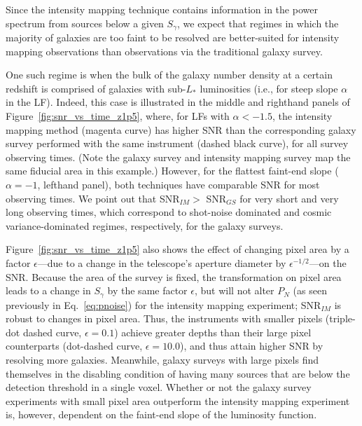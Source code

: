 \documentclass[12pt,preprint]{emulateapj}
\begin{document}
Since the intensity mapping technique contains information in the power spectrum from sources below a given $S_{\gamma}$, we expect that regimes in which the majority of galaxies are too faint to be resolved are better-suited for intensity mapping observations than observations via the traditional galaxy survey. 

One such regime is when the bulk of the galaxy number density at a certain redshift is comprised of galaxies with sub-$L_*$ luminosities (i.e., for steep slope $\alpha$ in the LF). Indeed, this case is illustrated in the middle and righthand panels of Figure~\ref{fig:snr_vs_time_z1p5}, where, for LFs with $\alpha < -1.5$, the intensity mapping method (magenta curve) has higher SNR than the corresponding galaxy survey performed with the same instrument (dashed black curve), for all survey observing times. (Note the galaxy survey and intensity mapping survey map the same fiducial area in this example.) However, for the flattest faint-end slope ($\alpha = -1$, lefthand panel), both techniques have comparable SNR for most observing times. We point out that SNR$_{IM} >$ SNR$_{GS}$ for very short and very long observing times, which correspond to shot-noise dominated and cosmic variance-dominated regimes, respectively, for the galaxy surveys. 

Figure~\ref{fig:snr_vs_time_z1p5} also shows the effect of changing pixel area by a factor $\epsilon$---due to a change in the telescope's aperture diameter by $\epsilon^{-1/2}$---on the SNR. Because the area of the survey is fixed, the transformation on pixel area leads to a change in $S_{\gamma}$ by the same factor $\epsilon$, but will not alter $P_{N}$ (as seen previously in Eq.~\ref{eq:pnoise}) for the intensity mapping experiment; SNR$_{IM}$ is robust to changes in pixel area. Thus, the instruments with smaller pixels (triple-dot dashed curve, $\epsilon = 0.1$) achieve greater depths than their large pixel counterparts (dot-dashed curve, $\epsilon = 10.0$), and thus attain higher SNR by resolving more galaxies. Meanwhile, galaxy surveys with large pixels find themselves in the disabling condition of having many sources that are below the detection threshold in a single voxel. Whether or not the galaxy survey experiments with small pixel area outperform the intensity mapping experiment is, however, dependent on the faint-end slope of the luminosity function. 
 
 
 
\end{document}
